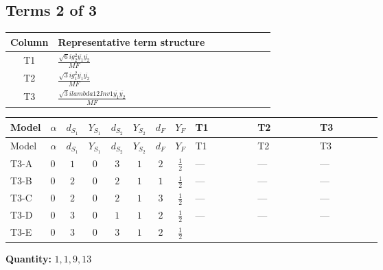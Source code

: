 \documentclass[8pt]{article}
\begin{document}
\begin{landscape}
\subsection*{Terms 2 of 3}
\begin{center}
\begin{tabular}{@{}c >{\raggedright\arraybackslash}p{0.82\linewidth}@{}}
\toprule
Column & Representative term structure \\
\midrule
T1 & \(\displaystyle \frac{\sqrt{6} i g_{2}^{2} \overline{y_{1}} \overline{y_{2}}}{MF}\) \\
\midrule
T2 & \(\displaystyle \frac{\sqrt{3} i g_{1}^{2} \overline{y_{1}} \overline{y_{2}}}{MF}\) \\
\midrule
T3 & \(\displaystyle \frac{\sqrt{3} i lambda12Inv1 \overline{y_{1}} \overline{y_{2}}}{MF}\) \\
\midrule
\bottomrule
\end{tabular}
\end{center}
\smallskip
\tiny
\begin{longtable}{@{}llcccccc >{\raggedright\arraybackslash}p{0.21\linewidth} >{\raggedright\arraybackslash}p{0.21\linewidth} >{\raggedright\arraybackslash}p{0.21\linewidth}@{}}
\toprule
Model & $\alpha$ & $d_{S_1}$ & $Y_{S_1}$ & $d_{S_2}$ & $Y_{S_2}$ & $d_F$ & $Y_F$ & T1 & T2 & T3 \\
\midrule
\endfirsthead
\toprule
Model & $\alpha$ & $d_{S_1}$ & $Y_{S_1}$ & $d_{S_2}$ & $Y_{S_2}$ & $d_F$ & $Y_F$ & T1 & T2 & T3 \\
\midrule
\endhead
T3-A & $0$ & $1$ & $0$ & $3$ & $1$ & $2$ & $\frac{1}{2}$ & --- & --- & --- \\
\midrule
T3-B & $0$ & $2$ & $0$ & $2$ & $1$ & $1$ & $\frac{1}{2}$ & --- & --- & --- \\
\midrule
T3-C & $0$ & $2$ & $0$ & $2$ & $1$ & $3$ & $\frac{1}{2}$ & --- & --- & --- \\
\midrule
T3-D & $0$ & $3$ & $0$ & $1$ & $1$ & $2$ & $\frac{1}{2}$ & --- & --- & --- \\
\midrule
T3-E & $0$ & $3$ & $0$ & $3$ & $1$ & $2$ & $\frac{1}{2}$ & \scriptsize\adjustbox{max width=\linewidth}{$\begin{gathered} - \frac{\sqrt{6} i g_{2}^{2} \overline{y_{1}} \overline{y_{2}}}{3 MF}\end{gathered}$} & \scriptsize\adjustbox{max width=\linewidth}{$\begin{gathered} - \frac{\sqrt{3} i g_{1}^{2} \overline{y_{1}} \overline{y_{2}}}{8 MF}\end{gathered}$} & \scriptsize\adjustbox{max width=\linewidth}{$\begin{gathered} \frac{\sqrt{3} i lambda12Inv1 \overline{y_{1}} \overline{y_{2}}}{6 MF}\end{gathered}$} \\
\midrule
\bottomrule
\end{longtable}
\clearpage
\noindent\textbf{Quantity: }$\mathrm{1,1,9,13}$\par\smallskip

\end{landscape}
\end{document}
